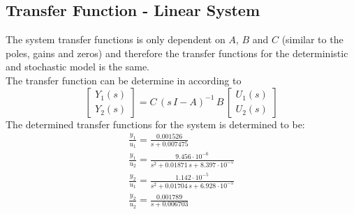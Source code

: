 \subsection{Transfer Function - Linear System}
The system transfer functions is only dependent on $A$, $B$ and $C$ (similar to the poles, gains and zeros) and therefore the transfer functions for the deterministic and stochastic model is the same.\\
The transfer function can be determine in according to
\begin{equation}
    \begin{bmatrix}
    Y_1(s)\\Y_2(s)
    \end{bmatrix}=C\,(s\,I-A)^{-1}\,B\,\begin{bmatrix}
    U_1(s)\\U_2(s)
    \end{bmatrix}
\end{equation}
The determined transfer functions for the system is determined to be:
\begin{equation}
    \begin{gathered}
        \frac{y_1}{u_1}=\frac{0.001526}{s+0.007475}\\
        \frac{y_1}{u_2}=\frac{9.456\cdot10^{-6}}{s^2+0.01871\,s+8.397\cdot10^{-5}}\\
        \frac{y_2}{u_1}=\frac{1.142\cdot10^{-5}}{s^2+0.01704\,s+6.928\cdot10^{-5}}\\
        \frac{y_2}{u_2}=\frac{0.001789}{s+0.006703}
    \end{gathered}
\end{equation}
